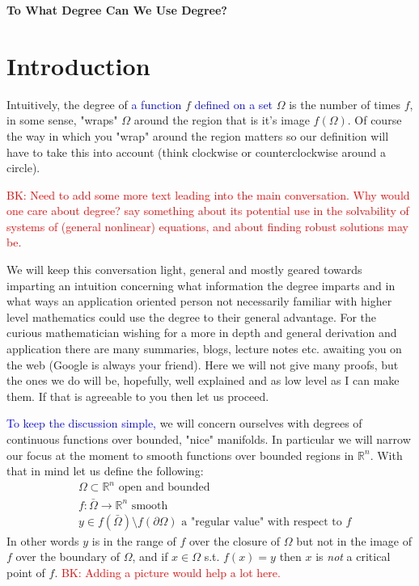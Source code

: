 \documentclass[11pt]{article}
\theoremstyle{plain}
\theoremstyle{definition}
\theoremstyle{remark}
\newcommand{\add}[1]{\textcolor{blue}{#1}}
\newcommand{\delete}[1]{\textcolor{red}{#1}}
\newcommand{\modified}[1]{\textcolor{darkgrn}{#1}}
\begin{document}
\begin{center}
\textbf{\modified{To What Degree Can We Use Degree?}} %
\end{center}

\section{Introduction}
\modified{Intuitively}, the degree of \add{a function} $f$ \add{defined on a set} $\Omega$
is the number of times $f$, in some sense, "wraps" $\Omega$ around the region that is it's image $f\left(\Omega\right)$.
Of course the way in which you "wrap" around the region matters so our definition will have to take this into account (think clockwise or counterclockwise around a circle).

\medskip
\noindent \delete{BK: Need to add some more text leading into the main
  conversation. Why would one care about degree? say something about
  its potential use in the solvability of systems of (general
  nonlinear) equations, and about finding robust solutions may be.}

We will keep this conversation light, general and mostly geared towards imparting an intuition concerning what information the degree imparts and in what ways an application oriented person not necessarily familiar with higher level mathematics could use the degree to their general advantage. For the curious mathematician wishing for a more in depth and general derivation and application there are many summaries, blogs, lecture notes etc. awaiting you on the web (Google is always your friend). Here we will not give many proofs, but the ones we do will be, hopefully, well explained and as low level as I can make them. If that is agreeable to you then let us proceed. 

\medskip
\add{To keep the discussion simple,} %
we will concern ourselves with degrees of continuous functions over bounded, "nice" manifolds. In particular we will narrow our focus at the moment to smooth functions over bounded regions in $\mathbb{R}^n$. With that in mind let us define the following: 
\begin{subequations}\label{eq:Vars}
\begin{align}
& \Omega\subset\mathbb{R}^n \text{ open and bounded }\\
& f:\bar{\Omega}\rightarrow \mathbb{R}^n \text{ smooth } \\
& y\in f\left(\bar{\Omega}\right)\setminus f\left(\partial\Omega\right) \text{ a "regular value" with respect to $f$}
\end{align}
\end{subequations}
In other words $y$ is in the range of $f$ over the closure of $\Omega$ but not in the image of $f$ over the boundary of $\Omega$, and if $x\in\Omega$ s.t. $f(x)=y$ then $x$ is \modified{\emph{not}} a critical point of $f$. \delete{BK: Adding a picture would help a lot here.} \\
\end{document}

